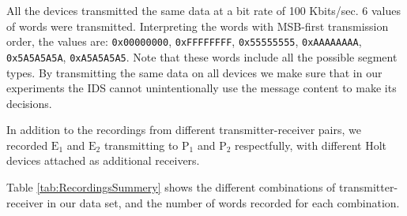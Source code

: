 \documentclass[compsoc,conference,a4paper,10pt,times]{IEEEtran}
\begin{document}
  All the devices transmitted the same data at a bit rate of 100 Kbits/sec. 6 values of words were transmitted. Interpreting the words with MSB-first transmission order, the values are: \texttt{0x00000000}, \texttt{0xFFFFFFFF}, \texttt{0x55555555}, \texttt{0xAAAAAAAA}, \texttt{0x5A5A5A5A}, \texttt{0xA5A5A5A5}. Note that these words include all the possible segment types. By transmitting the same data on all devices we make sure that in our experiments the IDS cannot unintentionally use the message content to make its decisions.
  
  In addition to the recordings from different transmitter-receiver pairs, we recorded \(\text{E}_1\) and \(\text{E}_2\) transmitting to \(\text{P}_1\) and \(\text{P}_2\) respectfully, with different Holt devices attached as additional receivers.
  
  Table \ref{tab:RecordingsSummery} shows the different combinations of transmitter-receiver in our data set, and the number of words recorded for each combination.
  
\end{document}
